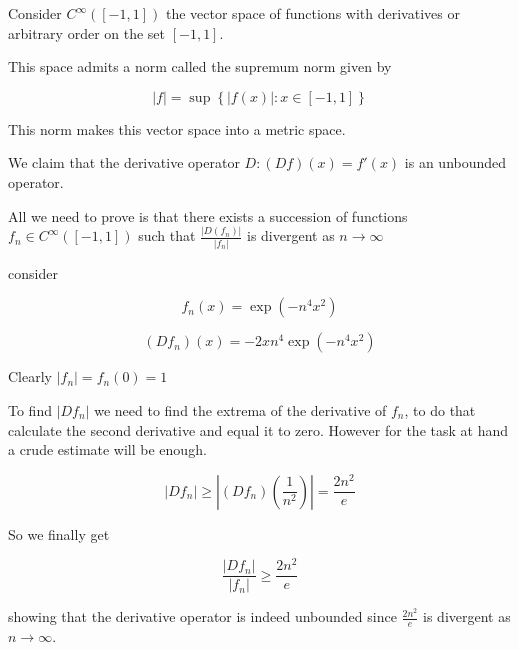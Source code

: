 \documentclass[12pt]{article}
\begin{document}
Consider $C^\infty([-1,1])$ the vector space of functions with derivatives or arbitrary order on the set $[-1,1]$.

This space admits a norm called the supremum norm given by

$$|f| = \sup \left\{|f(x)|: x\in [-1,1] \right\}$$

This norm makes this vector space into a metric space.

We claim that the derivative operator $D: (Df)(x) = f'(x)$ is an unbounded operator.


All we need to prove is that there exists a succession of functions $f_n\in C^\infty([-1,1])$ such that $\frac{|D(f_n)|}{|f_n|}$ is divergent as $n \to \infty$

consider

$$f_n (x) = \exp(-n^4 x^2)$$

$$(Df_n)(x) = -2x n^4  \exp(-n^4 x^2)$$

Clearly $|f_n| = f_n(0) = 1$

To find $|Df_n|$ we need to find the extrema of the derivative of $f_n$, to do that calculate the second derivative and equal it to zero. However for the task at hand a crude estimate will be enough.

$$ |Df_n| \ge |(Df_n)(\frac{1}{n^2})| = \frac{2n^2}{e}$$

So we finally get

$$\frac{|Df_n|}{|f_n|} \ge \frac{2n^2}{e}$$

showing that the derivative operator is indeed unbounded since $\frac{2n^2}{e}$ is divergent as $n \to \infty$.
\end{document}
